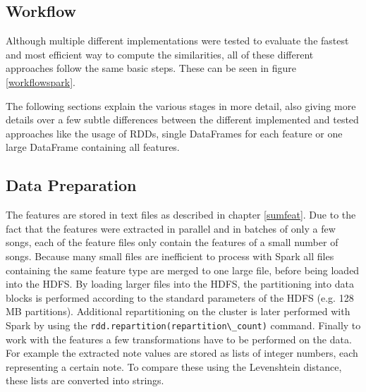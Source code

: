 \subsection{Workflow}

Although multiple different implementations were tested to evaluate the fastest and most efficient way to compute the similarities, all of these different approaches follow the same basic steps. These can be seen in figure \ref{workflowspark}.  

\begin{figure}[htbp]
	\centering
\end{figure}
\FloatBarrier

\noindent The following sections explain the various stages in more detail, also giving more details over a few subtle differences between the different implemented and tested approaches like the usage of RDDs, single DataFrames for each feature or one large DataFrame containing all features. 

\subsection{Data Preparation}

The features are stored in text files as described in chapter \ref{sumfeat}. Due to the fact that the features were extracted in parallel and in batches of only a few songs, each of the feature files only contain the features of a small number of songs. Because many small files are inefficient to process with Spark \cite[p. 153]{sparkbook1} all files containing the same feature type are merged to one large file, before being loaded into the HDFS. By loading larger files into the HDFS, the partitioning into data blocks is performed according to the standard parameters of the HDFS (e.g. 128 MB partitions). Additional repartitioning on the cluster is later performed with Spark by using the \lstinline{rdd.repartition(repartition\_count)} command. 
Finally to work with the features a few transformations have to be performed on the data. For example the extracted note values are stored as lists of integer numbers, each representing a certain note. To compare these using the Levenshtein distance, these lists are converted into strings. 

